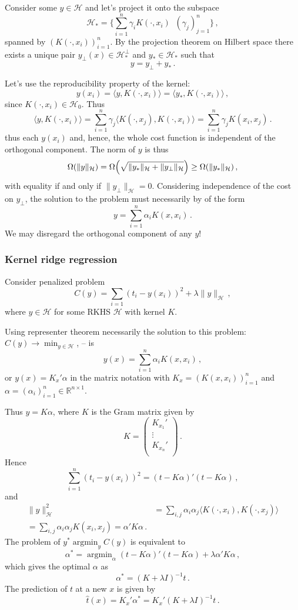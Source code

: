 \documentclass[a4paper]{article}
\newcommand{\Real}{\mathbb{R}}
\newcommand{\Hcal}{\mathcal{H}}
\newcommand{\argmin}{\mathop{\text{argmin}}}
\begin{document}
Consider some $y\in \Hcal$ and let's project it onto the subspace 
\[ \Hcal_* = \{\sum_{i=1}^n \gamma_i K(\cdot, x_i ) \,\:\,(\gamma_j)_{j=1}^n\}\,, \]
spanned by $(K(\cdot, x_i ))_{i=1}^n$.
By the projection theorem on Hilbert space there exists a unique pair 
$y_\perp(x)\in\Hcal_*^\perp$ and $y_* \in \Hcal_*$ such that
\[ y = y_\perp + y_* \,. \]

Let's use the reproducibility property of the kernel:
\[
y(x_i) = \langle y, K(\cdot,x_i) \rangle = \langle y_*, K(\cdot,x_i) \rangle\,,
\]
since $K(\cdot,x_i)\in \Hcal_0$. Thus
\[
\langle y, K(\cdot,x_i) \rangle
= \sum_{i=1}^n \gamma_j \langle K(\cdot, x_j ), K(\cdot,x_i) \rangle
= \sum_{i=1}^n \gamma_j K(x_i, x_j ) \,.
\]
thus each $y(x_i)$ and, hence, the whole cost function is independent of the orthogonal
component. The norm of $y$ is thus
\[
\Omega(\|y\|_\Hcal)
= \Omega\Bigl( \sqrt{\|y_*\|_\Hcal + \|y_\perp\|_\Hcal} \Bigr) 
\geq \Omega(\|y_*\|_\Hcal)\,,
\]
with equality if and only if $\|y_\perp\|_\Hcal = 0$. Considering independence of the
cost on $y_\perp$, the solution to the problem must necessarily by of the form
\[ y = \sum_{i=1}^n \alpha_i K(x, x_i) \,. \]
We may disregard the orthogonal component of any $y$!


\subsubsection{Kernel ridge regression} %
\label{ssub:kernel_ridge_regression}

Consider penalized problem
\[ C(y) = \sum_{i=1} (t_i - y(x_i))^2 + \lambda \|y\|_\Hcal\,,\]
where $y\in \Hcal$ for some RKHS $\Hcal$ with kernel $K$.

Using representer theorem necessarily the solution to this problem:
$C(y) \to \min_{y\in\Hcal}$, -- is
\[y(x) = \sum_{i=1}^n \alpha_i K(x,x_i)\,, \]
or $y(x) = K_x' \alpha$ in the matrix notation with $K_x = (K(x,x_i))_{i=1}^n$ and 
$\alpha = (\alpha_i)_{i=1}^n \in \Real^{n\times 1}$.

Thus $y = K \alpha$, where $K$ is the Gram matrix given by
\[ K = \begin{pmatrix} K_{x_1}'\\ \vdots\\ K_{x_n}'\\ \end{pmatrix}\,. \]
Hence
\[
\sum_{i=1}^n (t_i - y(x_i))^2 = (t-K\alpha)'(t-K\alpha)\,,
\]
and
\begin{align*}
\|y\|_{\Hcal}^2
	&= \sum_{i,j} \alpha_i \alpha_j \langle K(\cdot,x_i), K(\cdot,x_j)\rangle\\
	= \sum_{i,j} \alpha_i \alpha_j K(x_i,x_j)
	= \alpha' K \alpha\,.
\end{align*}
The problem of $y^* \argmin_y C(y)$ is equivalent to 
\[
\alpha^* = \argmin_\alpha (t-K\alpha)'(t-K\alpha) + \lambda \alpha' K \alpha\,,
\]
which gives the optimal $\alpha$ as
\[ \alpha^* = (K+\lambda I)^{-1} t\,. \]
The prediction of $t$ at a new $x$ is given by
\[ \hat{t}(x) = K_x'\alpha^* = K_x' (K+\lambda I)^{-1} t \,. \]
\end{document}
